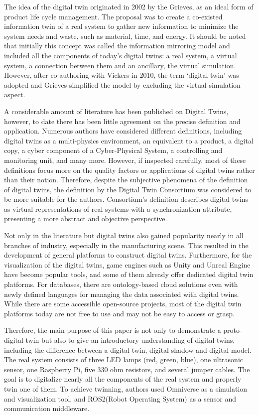 \documentclass[conference]{IEEEtran}
\begin{document}
    The idea of the digital twin originated in 2002 by the Grieves, as an ideal form of product life cycle management. 
    The proposal was to create a co-existed information twin of a real system to gather new information to minimize 
    the system needs and waste, such as material, time, and energy. It should be noted that initially this concept was 
    called the information mirroring model and included all the components of today's digital twins: a real system, 
    a virtual system, a connection between them and an ancillary, the virtual simulation. However, after co-authoring with Vickers in 2010, 
    the term `digital twin' was adopted and Grieves simplified the model by excluding the virtual simulation aspect.
    
    A considerable amount of literature has been published on Digital Twins, however, to date there has been little agreement on the precise definition and application. Numerous authors have considered different 
    definitions, including digital twins as a multi-physics environment, an equivalent to a product, a digital copy, a cyber component of a Cyber-Physical System, a controlling and monitoring unit,
    and many more. However, if inspected carefully, most of these definitions focus more on the quality factors or applications of digital twins rather than their notion.
    Therefore, despite the subjective phenomena of the definition of digital twins, the definition by the Digital Twin Consortium was considered to be more suitable for the authors. 
    Consortium's definition describes digital twins as virtual representations of real systems with a synchronization attribute,
    presenting a more abstract and objective perspective.

    Not only in the literature but digital twins also gained popularity 
    nearly in all branches of industry, especially in the manufacturing scene.  
    This resulted in the development of general platforms to construct digital twins. Furthermore, for the visualization of the digital twins, 
    game engines such as Unity and  Unreal Engine have become popular tools, and some of them already offer dedicated digital 
    twin platforms. 
    For databases, there are ontology-based cloud solutions even with newly defined languages for 
    managing the data associated with digital twins. While there are some accessible open-source projects, 
    most of the digital twin platforms today are not free to use and may not be easy to access or grasp. 

    Therefore, the main purpose of this paper is not only to demonstrate a proto-digital twin but also to give an introductory 
    understanding of digital twins, including the difference between a digital twin, digital shadow and digital model. The real system consists of three LED lamps (red, green, blue),
    one ultrasonic sensor, one Raspberry Pi, five 330 ohm resistors, and several jumper cables.
    The goal is to digitalize nearly all the components of the real system and properly twin one of them. To achieve twinning, 
    authors used Omniverse as a simulation and visualization tool, and ROS2(Robot Operating System) as a sensor and communication middleware. 
\end{document}
